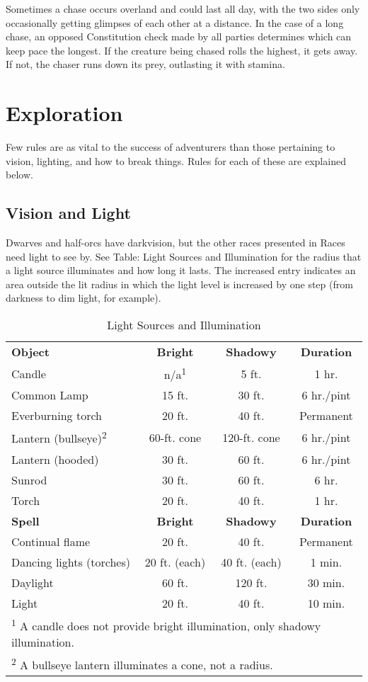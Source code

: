 Sometimes a chase occurs overland and could last all day, with the two sides only occasionally getting glimpses of each other at a distance. In the case of a long chase, an opposed Constitution check made by all parties determines which can keep pace the longest. If the creature being chased rolls the highest, it gets away. If not, the chaser runs down its prey, outlasting it with stamina.
				
\section{Exploration}

				
Few rules are as vital to the success of adventurers than those pertaining to vision, lighting, and how to break things. Rules for each of these are explained below.
				
\subsection{Vision and Light}

				
Dwarves and half-orcs have darkvision, but the other races presented in Races need light to see by. See Table: Light Sources and Illumination for the radius that a light source illuminates and how long it lasts. The increased entry indicates an area outside the lit radius in which the light level is increased by one step (from darkness to dim light, for example).

\begin{table}[htb]
\sffamily
{}
\caption{Light Sources and Illumination}
\centering
\begin{tabular}{l c c c}
\textbf{Object} & \textbf{Bright} & \textbf{Shadowy} & \textbf{Duration}\\
Candle & n/a\textsuperscript{1} & 5 ft. & 1 hr.\\
Common Lamp & 15 ft. & 30 ft. & 6 hr./pint\\
Everburning torch & 20 ft. & 40 ft. & Permanent\\
Lantern (bullseye)\textsuperscript{2} & 60-ft. cone & 120-ft. cone & 6 hr./pint\\
Lantern (hooded) & 30 ft. & 60 ft. & 6 hr./pint\\
Sunrod & 30 ft. & 60 ft. & 6 hr.\\
Torch & 20 ft. & 40 ft. & 1 hr.\\
\textbf{Spell} & \textbf{Bright} & \textbf{Shadowy} & \textbf{Duration}\\
Continual flame & 20 ft. & 40 ft. & Permanent\\
Dancing lights (torches) & 20 ft. (each) & 40 ft. (each) & 1 min.\\
Daylight & 60 ft. & 120 ft. & 30 min.\\
Light & 20 ft. & 40 ft. & 10 min.\\
\multicolumn{4}{l}{\textsuperscript{1} A candle does not provide bright illumination, only shadowy illumination.}\\
\multicolumn{4}{l}{\textsuperscript{2} A bullseye lantern illuminates a cone, not a radius.}\\
\end{tabular}
\end{table}

